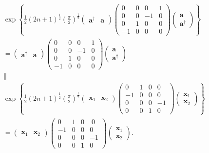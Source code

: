 \documentclass[aps, preprint]{revtex4}
\begin{document}
\begin{gather}\exp  \left \{\frac{1}{2} \left (2 n +1\right )^{\frac{1}{2}} \genfrac{(}{)}{}{}{\pi }{2}^{\frac{1}{2}} \left (\begin{array}{cc}\mathbf{a}^{ \dag } & \mathbf{a}\end{array}\right ) \left (\begin{array}{cccc}0 & 0 & 0 & 1 \\
0 & 0 &  -1 & 0 \\
0 & 1 & 0 & 0 \\
 -1 & 0 & 0 & 0\end{array}\right ) \left (\begin{array}{c}\mathbf{a} \\
\mathbf{a}^{ \dag }\end{array}\right )\right \} \\
 =\left (\begin{array}{cc}\mathbf{a}^{ \dag } & \mathbf{a}\end{array}\right ) \left (\begin{array}{cccc}0 & 0 & 0 & 1 \\
0 & 0 &  -1 & 0 \\
0 & 1 & 0 & 0 \\
 -1 & 0 & 0 & 0\end{array}\right ) \left (\begin{array}{c}\mathbf{a} \\
\mathbf{a}^{ \dag }\end{array}\right ) \\
 \parallel  \\
\exp  \left \{\frac{1}{2} \left (2 n +1\right )^{\frac{1}{2}} \genfrac{(}{)}{}{}{\pi }{2}^{\frac{1}{2}} \left (\begin{array}{cc}\mathbf{x}_{1} & \mathbf{x}_{2}\end{array}\right ) \left (\begin{array}{cccc}0 & 1 & 0 & 0 \\
 -1 & 0 & 0 & 0 \\
0 & 0 & 0 &  -1 \\
0 & 0 & 1 & 0\end{array}\right ) \left (\begin{array}{c}\mathbf{x}_{1} \\
\mathbf{x}_{2}\end{array}\right )\right \} \\
 =\left (\begin{array}{cc}\mathbf{x}_{1} & \mathbf{x}_{2}\end{array}\right ) \left (\begin{array}{cccc}0 & 1 & 0 & \;0 \\
 -1 & 0 & 0 & 0 \\
0 & 0 & 0 &  -1 \\
0 & 0 & 1 & 0\end{array}\right ) \left (\begin{array}{c}\mathbf{x}_{1} \\
\mathbf{x}_{2}\end{array}\right )\text{.}\end{gather}
\end{document}
